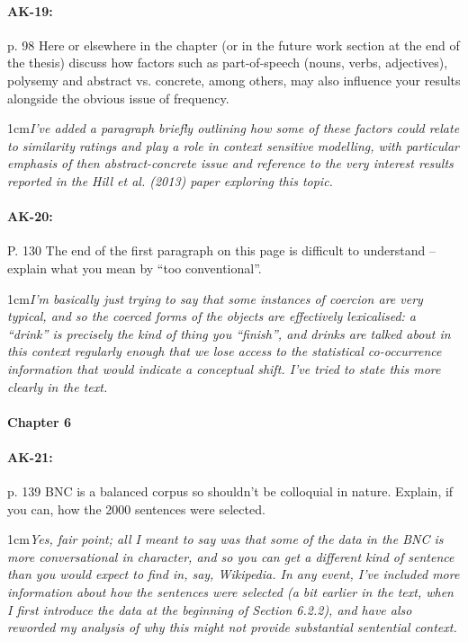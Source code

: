 \documentclass[11pt,a4paper]{article}
\newcommand{\res}[1]{\vspace{0.25cm} \begin{adjustwidth}{1cm}{}\emph{#1}\end{adjustwidth}}
\begin{document}
\paragraph{AK-19:} p. 98 Here or elsewhere in the chapter (or in the future work section at the end of the thesis) discuss how factors such as part-of-speech (nouns, verbs, adjectives), polysemy and abstract vs. concrete, among others, may also influence your results alongside the obvious issue of frequency.

\res{I've added a paragraph briefly outlining how some of these factors could relate to similarity ratings and play a role in context sensitive modelling, with particular emphasis of then abstract-concrete issue and reference to the very interest results reported in the Hill et al. (2013) paper exploring this topic.}

\paragraph{AK-20:} P. 130 The end of the first paragraph on this page is difficult to understand – explain what you mean by ``too conventional''.

\res{I'm basically just trying to say that some instances of coercion are very typical, and so the coerced forms of the objects are effectively lexicalised: a ``drink'' is precisely the kind of thing you ``finish'', and drinks are talked about in this context regularly enough that we lose access to the statistical co-occurrence information that would indicate a conceptual shift.  I've tried to state this more clearly in the text.}

\paragraph{Chapter 6}

\paragraph{AK-21:} p. 139 BNC is a balanced corpus so shouldn’t be colloquial in nature. Explain, if you can, how the 2000 sentences were selected.

\res{Yes, fair point; all I meant to say was that some of the data in the BNC is more conversational in character, and so you can get a different kind of sentence than you would expect to find in, say, Wikipedia.  In any event, I've included more information about how the sentences were selected (a bit earlier in the text, when I first introduce the data at the beginning of Section 6.2.2), and have also reworded my analysis of why this might not provide substantial sentential context.}
\end{document}
